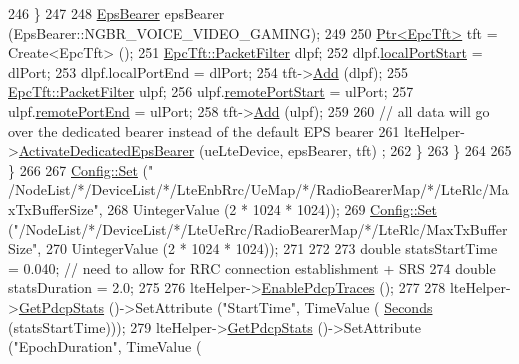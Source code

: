 \begin{DoxyCode}
246               \}
247 
248               \hyperlink{structns3_1_1EpsBearer}{EpsBearer} epsBearer (EpsBearer::NGBR\_VOICE\_VIDEO\_GAMING);
249 
250               \hyperlink{classns3_1_1Ptr}{Ptr<EpcTft>} tft = Create<EpcTft> ();
251               \hyperlink{structns3_1_1EpcTft_1_1PacketFilter}{EpcTft::PacketFilter} dlpf;
252               dlpf.\hyperlink{structns3_1_1EpcTft_1_1PacketFilter_afd505cda437b1687abc4432a8bcefbaf}{localPortStart} = dlPort;
253               dlpf.localPortEnd = dlPort;
254               tft->\hyperlink{classns3_1_1EpcTft_a1228456a8abbe48cbc89bbe2d2e9af48}{Add} (dlpf);
255               \hyperlink{structns3_1_1EpcTft_1_1PacketFilter}{EpcTft::PacketFilter} ulpf;
256               ulpf.\hyperlink{structns3_1_1EpcTft_1_1PacketFilter_aa96ab9356c91b14059220d00155c32b5}{remotePortStart} = ulPort;
257               ulpf.\hyperlink{structns3_1_1EpcTft_1_1PacketFilter_a4bcdd15a9526e27eabd474276f691cf1}{remotePortEnd} = ulPort;
258               tft->\hyperlink{classns3_1_1EpcTft_a1228456a8abbe48cbc89bbe2d2e9af48}{Add} (ulpf);                            
259  
260               \textcolor{comment}{// all data will go over the dedicated bearer instead of the default EPS bearer}
261               lteHelper->\hyperlink{classns3_1_1LteHelper_af28041edd4c96bde1a2e07c90e363dcc}{ActivateDedicatedEpsBearer} (ueLteDevice, epsBearer, tft)
      ;
262             \}
263         \} 
264             
265     \} 
266 
267   \hyperlink{group__config_gadce03667ec621d64ce4aace85d9bcfd0}{Config::Set} (\textcolor{stringliteral}{"
      /NodeList/*/DeviceList/*/LteEnbRrc/UeMap/*/RadioBearerMap/*/LteRlc/MaxTxBufferSize"},
268                UintegerValue (2 * 1024 * 1024));
269   \hyperlink{group__config_gadce03667ec621d64ce4aace85d9bcfd0}{Config::Set} (\textcolor{stringliteral}{"/NodeList/*/DeviceList/*/LteUeRrc/RadioBearerMap/*/LteRlc/MaxTxBufferSize"},
270                UintegerValue (2 * 1024 * 1024));
271 
272 
273   \textcolor{keywordtype}{double} statsStartTime = 0.040; \textcolor{comment}{// need to allow for RRC connection establishment + SRS}
274   \textcolor{keywordtype}{double} statsDuration = 2.0;
275     
276   lteHelper->\hyperlink{classns3_1_1LteHelper_adc62a53efe0437cf09062c9d6a95af3d}{EnablePdcpTraces} ();
277 
278   lteHelper->\hyperlink{classns3_1_1LteHelper_a1017c1f2ee9f5a640c50c25161a57758}{GetPdcpStats} ()->SetAttribute (\textcolor{stringliteral}{"StartTime"}, TimeValue (
      \hyperlink{group__timecivil_ga33c34b816f8ff6628e33d5c8e9713b9e}{Seconds} (statsStartTime)));
279   lteHelper->\hyperlink{classns3_1_1LteHelper_a1017c1f2ee9f5a640c50c25161a57758}{GetPdcpStats} ()->SetAttribute (\textcolor{stringliteral}{"EpochDuration"}, TimeValue (

\end{DoxyCode}
